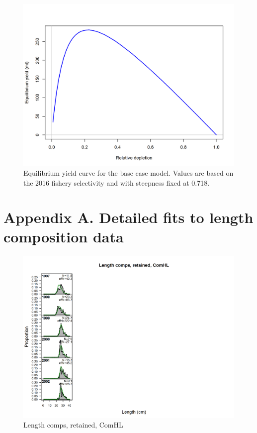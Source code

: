 \documentclass[12pt,]{article}
\begin{document}
\begin{figure}[htbp]
\centering
\includegraphics{r4ss/plots_mod1/yield1_yield_curve.png}
\caption{Equilibrium yield curve for the base case model. Values are
based on the 2016 fishery selectivity and with steepness fixed at 0.718.
\label{fig:yield1_yield_curve}}
\end{figure}

\FloatBarrier

\FloatBarrier
\newpage

\section*{Appendix A. Detailed fits to length composition
data}\label{appendix-a.-detailed-fits-to-length-composition-data}

\renewcommand{\thepage}{A-\arabic{page}}
\renewcommand{\thefigure}{A\arabic{figure}}

\setcounter{page}{1}

\begin{figure}[htbp]
\centering
\includegraphics{./r4ss/plots_mod1/comp_lenfit_flt1mkt2.png}
\caption{Length comps, retained, ComHL
\label{fig:mod1_1_comp_lenfit_flt1mkt2}}
\end{figure}
\end{document}
